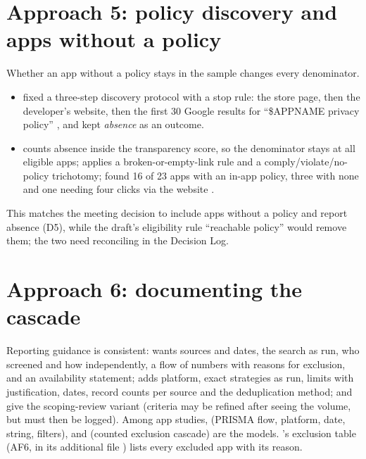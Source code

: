 \section{Approach 5: policy discovery and apps without a policy}
Whether an app without a policy stays in the sample changes every denominator.
\begin{itemize}
\item {} fixed a three-step discovery protocol with a stop rule: the store page, then the developer's website, then the first 30 Google results for ``\$APPNAME privacy policy'' , and kept \emph{absence} as an outcome.
\item {} counts absence inside the transparency score, so the denominator stays at all eligible apps;  applies a broken-or-empty-link rule and a comply/violate/no-policy trichotomy;  found 16 of 23 apps with an in-app policy, three with none and one needing four clicks via the website .
\end{itemize}
This matches the meeting decision to include apps without a policy and report absence (D5), while the draft's eligibility rule ``reachable policy'' would remove them; the two need reconciling in the Decision Log.

\section{Approach 6: documenting the cascade}
Reporting guidance is consistent:  wants sources and dates, the search as run, who screened and how independently, a flow of numbers with reasons for exclusion, and an availability statement;  adds platform, exact strategies as run, limits with justification, dates, record counts per source and the deduplication method;  and  give the scoping-review variant (criteria may be refined after seeing the volume, but must then be logged). Among app studies,  (PRISMA flow, platform, date, string, filters),  and  (counted exclusion cascade) are the models. 's exclusion table (AF6, in its additional file ) lists every excluded app with its reason.

